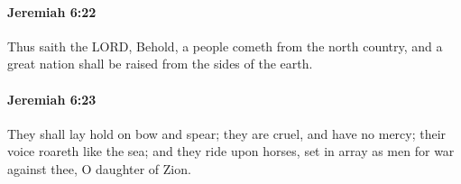 		\paragraph{Jeremiah 6:22} %
			\label{JEREMIAH-6-22}

			Thus saith the LORD, Behold, a people cometh from the north country, and a great nation shall be raised from the sides of the earth.


		\paragraph{Jeremiah 6:23} %
			\label{JEREMIAH-6-23}

			They shall lay hold on bow and spear; they are cruel, and have no mercy; their voice roareth like the sea; and they ride upon horses, set in array as men for war against thee, O daughter of Zion.



